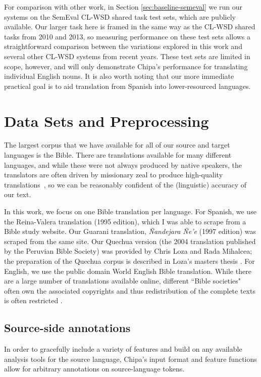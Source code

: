 For comparison with other work, in Section \ref{sec:baseline-semeval} we run
our systems on the SemEval CL-WSD shared task test sets, which are publicly
available.  Our larger task here is framed in the same way as the CL-WSD shared
tasks from 2010 and 2013, so measuring performance on these test sets allows a
straightforward comparison between the variations explored in this work and
several other CL-WSD systems from recent years. These test sets are limited in
scope, however, and will only demonstrate Chipa's performance for translating
individual English nouns. It is also worth noting that our more immediate
practical goal is to aid translation from Spanish into lower-resourced
languages. 

\section{Data Sets and Preprocessing}
\label{sec:datasetsandpreprocessing}
The largest corpus that we have available for all of our source and target
languages is the Bible. There are translations available for many different
languages, and while these were not always produced by native speakers, the
translators are often driven by missionary zeal to produce high-quality
translations~\cite{DBLP:journals/lre/ResnikOD99}, so we can be reasonably
confident of the (linguistic) accuracy of our text.

In this work, we focus on one Bible translation per language. For Spanish, we
use the Reina-Valera translation (1995 edition), which I was able to scrape
from a Bible study website. Our Guarani translation, \emph{Ñandejara Ñe'e}
(1997 edition) was scraped from the same site. Our Quechua version (the 2004
translation published by the Peruvian Bible Society) was provided by Chris Loza
and Rada Mihalcea; the preparation of the Quechua corpus is described in Loza's
masters thesis \cite{chrisloza}. For English, we use the public domain World
English Bible translation.
While there are a large number of translations available online, different
``Bible societies" often own the associated copyrights and thus redistribution
of the complete texts is often restricted \cite{MAYER14.220.L14-1215}.

\subsection{Source-side annotations}
\label{sec:annotations}
In order to gracefully include a variety of features and build on
any available analysis tools for the source language, Chipa's input format and
feature functions allow for arbitrary annotations on source-language tokens.

